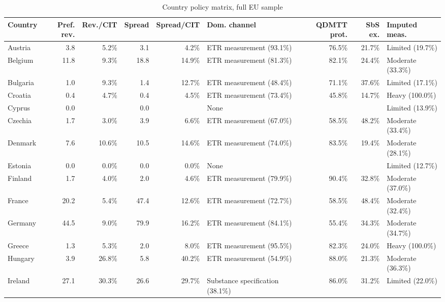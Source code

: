 \begin{table}[H]
\centering
\scriptsize
\setlength{\tabcolsep}{2pt}
\caption{Country policy matrix, full EU sample}
\label{tab:app_country_policy_matrix}
\begin{adjustbox}{max width=\textwidth,center}
\begin{tabular}{@{}lrrrrL{2.3cm}rrL{1.6cm}@{}}
\toprule
Country & Pref. rev. & Rev./CIT & Spread & Spread/CIT & Dom. channel & QDMTT prot. & SbS ex. & Imputed meas. \\
\midrule
Austria &  3.8 &   5.2\% &  3.1 &   4.2\% & ETR measurement (93.1\%) &  76.5\% & 21.7\% & Limited (19.7\%) \\
Belgium & 11.8 &   9.3\% & 18.8 &  14.9\% & ETR measurement (81.3\%) &  82.1\% & 24.4\% & Moderate (33.3\%) \\
Bulgaria &  1.0 &   9.3\% &  1.4 &  12.7\% & ETR measurement (48.4\%) &  71.1\% & 37.6\% & Limited (17.1\%) \\
Croatia &  0.4 &   4.7\% &  0.4 &   4.5\% & ETR measurement (73.4\%) &  45.8\% & 14.7\% & Heavy (100.0\%) \\
Cyprus &  0.0 &  &  0.0 &  & None &  &  & Limited (13.9\%) \\
Czechia &  1.7 &   3.0\% &  3.9 &   6.6\% & ETR measurement (67.0\%) &  58.5\% & 48.2\% & Moderate (33.4\%) \\
Denmark &  7.6 &  10.6\% & 10.5 &  14.6\% & ETR measurement (74.0\%) &  83.5\% & 19.4\% & Moderate (28.1\%) \\
Estonia &  0.0 &   0.0\% &  0.0 &   0.0\% & None &  &  & Limited (12.7\%) \\
Finland &  1.7 &   4.0\% &  2.0 &   4.6\% & ETR measurement (79.9\%) &  90.4\% & 32.8\% & Moderate (37.0\%) \\
France & 20.2 &   5.4\% & 47.4 &  12.6\% & ETR measurement (72.7\%) &  58.5\% & 48.4\% & Moderate (32.4\%) \\
Germany & 44.5 &   9.0\% & 79.9 &  16.2\% & ETR measurement (84.1\%) &  55.4\% & 34.3\% & Moderate (34.7\%) \\
Greece &  1.3 &   5.3\% &  2.0 &   8.0\% & ETR measurement (95.5\%) &  82.3\% & 24.0\% & Heavy (100.0\%) \\
Hungary &  3.9 &  26.8\% &  5.8 &  40.2\% & ETR measurement (54.9\%) &  88.0\% & 21.3\% & Moderate (36.3\%) \\
Ireland & 27.1 &  30.3\% & 26.6 &  29.7\% & Substance specification (38.1\%) &  86.0\% & 31.2\% & Limited (22.0\%) \\

\end{tabular}
\end{adjustbox}
\end{table}
